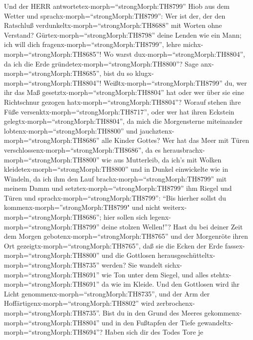  Und der HERR antwortetex-morph=``strongMorph:TH8799'' Hiob
aus dem Wetter und sprachx-morph=``strongMorph:TH8799'': 
Wer ist der, der den Ratschluß verdunkeltx-morph=``strongMorph:TH8688''
mit Worten ohne Verstand? 
Gürtex-morph=``strongMorph:TH8798'' deine Lenden wie ein Mann; ich will
dich fragenx-morph=``strongMorph:TH8799'', lehre
michx-morph=``strongMorph:TH8685''!  Wo warst
dux-morph=``strongMorph:TH8804'', da ich die Erde
gründetex-morph=``strongMorph:TH8800''? Sage
anx-morph=``strongMorph:TH8685'', bist du so
klugx-morph=``strongMorph:TH8804''! 
Weißtx-morph=``strongMorph:TH8799'' du, wer ihr das Maß
gesetztx-morph=``strongMorph:TH8804'' hat oder wer über sie eine
Richtschnur gezogen hatx-morph=``strongMorph:TH8804''? 
Worauf stehen ihre Füße versenktx-morph=``strongMorph:TH8717'', oder wer
hat ihren Eckstein gelegtx-morph=``strongMorph:TH8804'',  da
mich die Morgensterne miteinander lobtenx-morph=``strongMorph:TH8800''
und jauchztenx-morph=``strongMorph:TH8686'' alle Kinder Gottes?
 Wer hat das Meer mit Türen
verschlossenx-morph=``strongMorph:TH8686'', da es
herausbrachx-morph=``strongMorph:TH8800'' wie aus Mutterleib,
 da ich's mit Wolken kleidetex-morph=``strongMorph:TH8800''
und in Dunkel einwickelte wie in Windeln,  da ich ihm den
Lauf brachx-morph=``strongMorph:TH8799'' mit meinem Damm und
setztex-morph=``strongMorph:TH8799'' ihm Riegel und Türen 
und sprachx-morph=``strongMorph:TH8799'': ``Bis hierher sollst du
kommenx-morph=''strongMorph:TH8799" und nicht
weiterx-morph=``strongMorph:TH8686''; hier sollen sich
legenx-morph=``strongMorph:TH8799'' deine stolzen Wellen!''?
 Hast du bei deiner Zeit dem Morgen
gebotenx-morph=``strongMorph:TH8765'' und der Morgenröte ihren Ort
gezeigtx-morph=``strongMorph:TH8765'',  daß sie die Ecken
der Erde fassex-morph=``strongMorph:TH8800'' und die Gottlosen
herausgeschütteltx-morph=``strongMorph:TH8735'' werden? 
Sie wandelt sichx-morph=``strongMorph:TH8691'' wie Ton unter dem Siegel,
und alles stehtx-morph=``strongMorph:TH8691'' da wie im Kleide.
 Und den Gottlosen wird ihr Licht
genommenx-morph=``strongMorph:TH8735'', und der Arm der
Hoffärtigenx-morph=``strongMorph:TH8802'' wird
zerbrochenx-morph=``strongMorph:TH8735''.  Bist du in den
Grund des Meeres gekommenx-morph=``strongMorph:TH8804'' und in den
Fußtapfen der Tiefe gewandeltx-morph=``strongMorph:TH8694''?
 Haben sich dir des Todes Tore je
